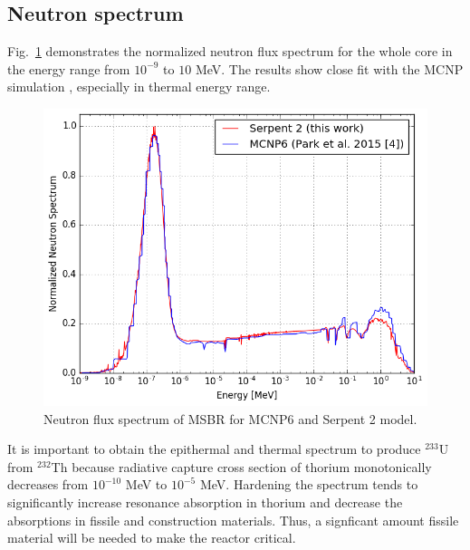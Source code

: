 \documentclass{anstrans}
\begin{document}
\subsection{Neutron spectrum}
Fig.~\ref{fig:spectrum} demonstrates the normalized neutron flux spectrum for 
the whole core in the energy range from $10^{-9}$ to $10$ MeV. The results show 
close fit with the MCNP simulation \cite{park_whole_2015}, especially in 
thermal energy range.  
\begin{figure}[b!] %
  \centering
  \includegraphics[width=1.05\linewidth]{figure_3_1.png} \caption{Neutron flux 
  spectrum of \gls{MSBR} for MCNP6 and Serpent 2 model.}
  \label{fig:spectrum}
\end{figure}
It is important to obtain the epithermal and thermal spectrum to produce 
$^{233}$U from $^{232}$Th because radiative capture cross section of thorium 
monotonically decreases from $10^{-10}$ MeV to $10^{-5}$ MeV. Hardening the 
spectrum tends to significantly increase resonance absorption in thorium and 
decrease the absorptions in fissile and construction materials. Thus, a 
signficant amount fissile material will be needed to make the reactor critical.
\end{document}
